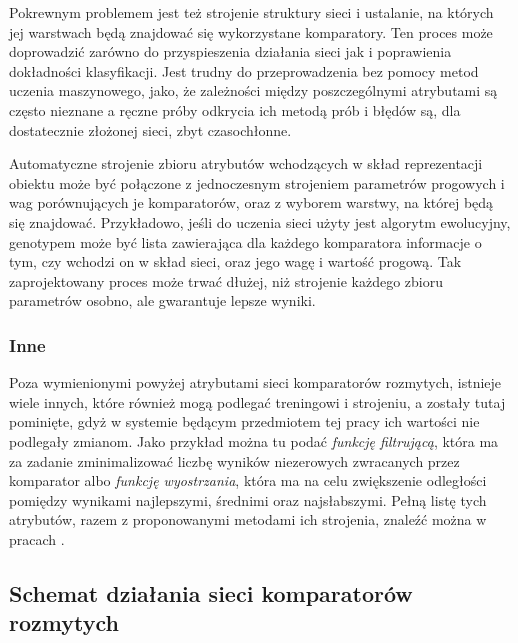 \documentclass{pracalicmgr}
\begin{document}
    Pokrewnym problemem jest też strojenie struktury sieci i ustalanie, na których jej warstwach będą znajdować się wykorzystane komparatory. Ten proces może doprowadzić zarówno do przyspieszenia działania sieci jak i poprawienia dokładności klasyfikacji. Jest trudny do przeprowadzenia bez pomocy metod uczenia maszynowego, jako, że zależności między poszczególnymi atrybutami są często nieznane a ręczne próby odkrycia ich metodą prób i błędów są, dla dostatecznie złożonej sieci, zbyt czasochłonne.
    
    Automatyczne strojenie zbioru atrybutów wchodzących w skład reprezentacji obiektu może być połączone z jednoczesnym strojeniem parametrów progowych i wag porównujących je komparatorów, oraz z wyborem warstwy, na której będą się znajdować. Przykładowo, jeśli do uczenia sieci użyty jest algorytm ewolucyjny, genotypem może być lista zawierająca dla każdego komparatora informacje o tym, czy wchodzi on w skład sieci, oraz jego wagę i wartość progową. Tak zaprojektowany proces może trwać dłużej, niż strojenie każdego zbioru parametrów osobno, ale gwarantuje lepsze wyniki.
    \subsubsection{Inne}
    Poza wymienionymi powyżej atrybutami sieci komparatorów rozmytych, istnieje wiele innych, które również mogą podlegać treningowi i strojeniu, a zostały tutaj pominięte, gdyż w systemie będącym przedmiotem tej pracy ich wartości nie podlegały zmianom. Jako przykład można tu podać \textit{funkcję filtrującą}, która ma za zadanie zminimalizować liczbę wyników niezerowych zwracanych przez komparator albo \textit{funkcję wyostrzania}, która ma na celu zwiększenie odległości pomiędzy wynikami najlepszymi, średnimi oraz najsłabszymi. Pełną listę tych atrybutów, razem z proponowanymi metodami ich strojenia, znaleźć można w pracach \citep{sosnowski:compar,  sosnowski:training}.
    \subsection[Schemat działania sieci]{Schemat działania sieci komparatorów rozmytych}
\end{document}

